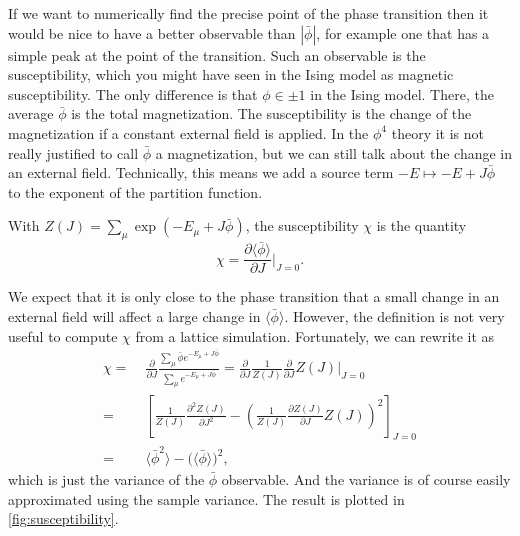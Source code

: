 \documentclass[12pt]{article}
\begin{document}
If we want to numerically find the precise point of the phase
transition then it would be nice to have a better observable than
$|\bar\phi|$, for example one that has a simple peak at the point of
the transition. Such an observable is the susceptibility, which you
might have seen in the Ising model as magnetic susceptibility. The
only difference is that $\phi\in \pm 1$ in the Ising model. There, the
average $\bar\phi$ is the total magnetization. The susceptibility is
the change of the magnetization if a constant external field is
applied. In the $\phi^4$ theory it is not really justified to call
$\bar\phi$ a magnetization, but we can still talk about the change
in an external field. Technically, this means we add a source term $-E
\mapsto -E + J\bar\phi$ to the exponent of the partition function.
\begin{definition}
  With $Z(J) = \sum_\mu \exp(-E_\mu + J\bar\phi)$, the susceptibility $\chi$
  is the quantity
  \begin{equation}
    \chi = \frac{\partial\langle \bar\phi\rangle}{\partial J} \Big|_{J=0}.
  \end{equation}
\end{definition}
We expect that it is only close to the phase transition that a small
change in an external field will affect a large change in
$\langle\bar\phi\rangle$. However, the definition is not very useful
to compute $\chi$ from a lattice simulation. Fortunately, we can
rewrite it as
\begin{equation}
  \begin{split}
    \chi  =&\;
    \frac{\partial}{\partial J}
    \frac{\sum_\mu \bar\phi e^{-E_\mu +J\bar\phi}}
    {\sum_\mu e^{-E_\mu +J\bar\phi}} = 
    \frac{\partial}{\partial J} \frac{1}{Z(J)}
    \frac{\partial}{\partial J} Z(J) \big|_{J=0}
    \\ =&\;
    \left[
      \frac{1}{Z(J)}
      \frac{\partial^2 Z(J)}{\partial J^2} -
      \left(
        \frac{1}{Z(J)} \frac{\partial Z(J)}{\partial J} Z(J)
      \right)^2
    \right]_{J=0}
    \\ =&\;
    \langle \bar\phi^2 \rangle - \big( \langle\bar\phi\rangle \big)^2,
  \end{split}
\end{equation}
which is just the variance of the $\bar\phi$ observable. And the
variance is of course easily approximated using the sample
variance. The result is plotted in \autoref{fig:susceptibility}.
\end{document}
